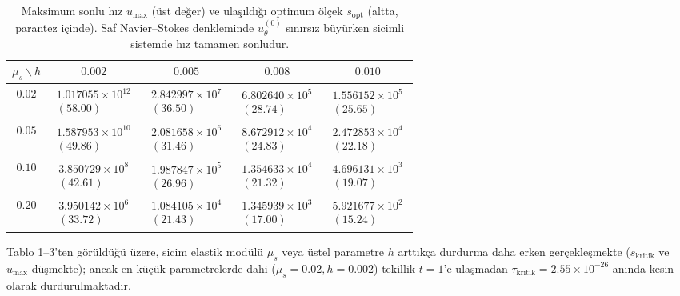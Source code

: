 \documentclass[12pt,a4paper]{article}
\begin{document}
\begin{table}[htbp]
\centering
\footnotesize
\setlength{\tabcolsep}{4pt}
\caption{Maksimum sonlu hız $u_{\max}$ (üst değer) ve ulaşıldığı optimum ölçek $s_{\mathrm{opt}}$ (altta, parantez içinde). Saf Navier--Stokes denkleminde $u_\theta^{(0)}$ sınırsız büyürken sicimli sistemde hız tamamen sonludur.}
\vspace{0.15cm}
\begin{tabular}{c|cccc}
\hline
$\mu_s \backslash h$ & $0.002$ & $0.005$ & $0.008$ & $0.010$ \\
\hline
$0.02$ & $\substack{1.017055\times10^{12}\\(58.00)}$ & $\substack{2.842997\times10^{7}\\(36.50)}$ & $\substack{6.802640\times10^{5}\\(28.74)}$ & $\substack{1.556152\times10^{5}\\(25.65)}$ \\
$0.05$ & $\substack{1.587953\times10^{10}\\(49.86)}$ & $\substack{2.081658\times10^{6}\\(31.46)}$ & $\substack{8.672912\times10^{4}\\(24.83)}$ & $\substack{2.472853\times10^{4}\\(22.18)}$ \\
$0.10$ & $\substack{3.850729\times10^{8}\\(42.61)}$ & $\substack{1.987847\times10^{5}\\(26.96)}$ & $\substack{1.354633\times10^{4}\\(21.32)}$ & $\substack{4.696131\times10^{3}\\(19.07)}$ \\
$0.20$ & $\substack{3.950142\times10^{6}\\(33.72)}$ & $\substack{1.084105\times10^{4}\\(21.43)}$ & $\substack{1.345939\times10^{3}\\(17.00)}$ & $\substack{5.921677\times10^{2}\\(15.24)}$ \\
\hline
\end{tabular}
\end{table}

Tablo 1--3'ten görüldüğü üzere, sicim elastik modülü $\mu_s$ veya üstel parametre $h$ arttıkça durdurma daha erken gerçekleşmekte ($s_{\mathrm{kritik}}$ ve $u_{\max}$ düşmekte); ancak en küçük parametrelerde dahi ($\mu_s = 0.02, h = 0.002$) tekillik $t=1$'e ulaşmadan $\tau_{\mathrm{kritik}} = 2.55 \times 10^{-26}$ anında kesin olarak durdurulmaktadır.
\end{document}
